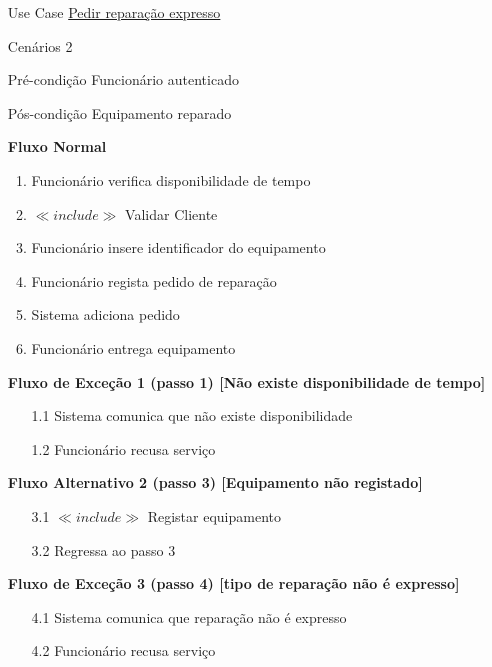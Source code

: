 \documentclass[../relatorio.tex]{subfiles}
\begin{document}
\begin{itemize}
    \item[Use Case] {\underline{Pedir reparação expresso}}
    \item[Cenários] {2}
    \item[Pré-condição] {Funcionário autenticado}
    \item[Pós-condição] {Equipamento reparado}
          \begin{flushleft}
              \textbf{Fluxo Normal}
          \end{flushleft}
          \begin{enumerate}
              \item Funcionário verifica disponibilidade de tempo
              \item {$\ll include \gg$ Validar Cliente}
              \item Funcionário insere identificador do equipamento
              \item Funcionário regista pedido de reparação
              \item Sistema adiciona pedido
              \item Funcionário entrega equipamento
          \end{enumerate}

          \begin{flushleft}
              \textbf{Fluxo de Exceção 1 (passo 1) [Não existe disponibilidade de tempo]}
          \end{flushleft}
          \begin{itemize}
              \item[1.1]{Sistema comunica que não existe disponibilidade}
              \item[1.2]{Funcionário recusa serviço}
          \end{itemize}
          \begin{flushleft}
              \textbf{Fluxo Alternativo 2 (passo 3) [Equipamento não registado]}
          \end{flushleft}
          \begin{itemize}
              \item[3.1] $\ll include \gg$ Registar equipamento
              \item[3.2] Regressa ao passo 3
          \end{itemize}
          \begin{flushleft}
              \textbf{Fluxo de Exceção 3 (passo 4) [tipo de reparação não é expresso]}
          \end{flushleft}
          \begin{itemize}
              \item[4.1]{Sistema comunica que reparação não é expresso}
              \item[4.2]{Funcionário recusa serviço}
          \end{itemize}
\end{itemize}
\end{document}
